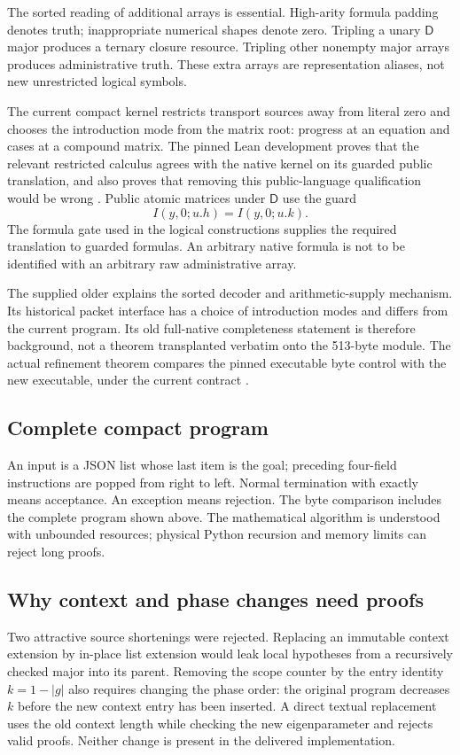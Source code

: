 \documentclass[11pt,letterpaper]{article}
\theoremstyle{definition}
\newcommand{\D}{\mathsf D}
\newcommand{\file}[1]{\texttt{\detokenize{#1}}}
\begin{document}
The sorted reading of additional arrays is essential. High-arity formula
padding denotes truth; inappropriate numerical shapes denote zero.
Tripling a unary $\D$ major produces a ternary closure resource. Tripling
other nonempty major arrays produces administrative truth. These extra
arrays are representation aliases, not new unrestricted logical symbols.

The current compact kernel restricts transport sources away from literal
zero and chooses the introduction mode from the matrix root: progress at
an equation and cases at a compound matrix. The pinned Lean development
proves that the relevant restricted calculus agrees with the native
kernel on its guarded public translation, and also proves that removing
this public-language qualification would be wrong \cite{current}.
Public atomic matrices under $\D$ use the guard
\[
 I(y,0;u.h)=I(y,0;u.k).
\]
The formula gate used in the logical constructions supplies the required
translation to guarded formulas. An arbitrary native formula is not to be
identified with an arbitrary raw administrative array.

The supplied older \file{inherited_arity_checker.tex} explains the sorted
decoder and arithmetic-supply mechanism. Its historical packet interface
has a choice of introduction modes and differs from the current program.
Its old full-native completeness statement is therefore background, not
a theorem transplanted verbatim onto the 513-byte module. The actual
refinement theorem compares the pinned executable byte control with the
new executable, under the current contract \cite{compact}.

\subsection{Complete compact program}

An input is a JSON list whose last item is the goal; preceding four-field
instructions are popped from right to left. Normal termination with exactly
\file{ACCEPT\string\n} means acceptance. An exception means rejection.
The byte comparison includes the complete program shown above. The
mathematical algorithm is understood with unbounded resources; physical
Python recursion and memory limits can reject long proofs.

\subsection{Why context and phase changes need proofs}
Two attractive source shortenings were rejected. Replacing an immutable
context extension by in-place list extension would leak local hypotheses
from a recursively checked major into its parent. Removing the scope
counter by the entry identity $k=1-|g|$ also requires changing the phase
order: the original program decreases $k$ before the new context entry
has been inserted. A direct textual replacement uses the old context
length while checking the new eigenparameter and rejects valid proofs.
Neither change is present in the delivered implementation.
\end{document}
